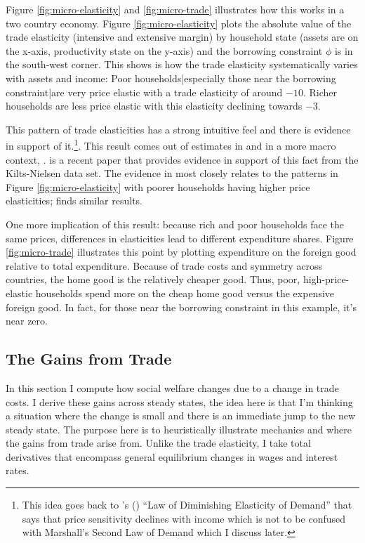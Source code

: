 \documentclass[12pt,pdftex]{article}
\def\citeapos#1{\citeauthor{#1}'s (\citeyear{#1})}
\begin{document}
\begin{onehalfspacing}
Figure \ref{fig:micro-elasticity} and \ref{fig:micro-trade} illustrates how this works in a two country economy. Figure \ref{fig:micro-elasticity} plots the absolute value of the trade elasticity (intensive and extensive margin) by household state (assets are on the x-axis, productivity state on the y-axis) and the borrowing constraint $\phi$ is in the south-west corner. This shows is how the trade elasticity systematically varies with assets and income: Poor households|especially those near the borrowing constraint|are very price elastic with a trade elasticity of around $-10$. Richer households are less price elastic with this elasticity declining towards $-3.$

This pattern of trade elasticities has a strong intuitive feel and there is evidence in support of it.\footnote{This idea goes back to \citeapos{harrod1936trade} ``Law of Diminishing Elasticity of Demand'' that says that price sensitivity declines with income which is not to be confused with Marshall's Second Law of Demand which I discuss later.}. This result comes out of estimates in \citet{berry1995automobile} and in a more macro context, \citet{nakamura2010accounting}. \citet{sangani2022markups} is a recent paper that provides evidence in support of this fact from the Kilts-Nielsen data set. The evidence in \citet*{auer2022unequal} most closely relates to the patterns in Figure \ref{fig:micro-elasticity} with poorer households having higher price elasticities; \citet*{colicev2022impact} finds similar results.

One more implication of this result: because rich and poor households face the same prices, differences in elasticities lead to different expenditure shares. Figure \ref{fig:micro-trade} illustrates this point by plotting expenditure on the foreign good relative to total expenditure. Because of trade costs and symmetry across countries, the home good is the relatively cheaper good. Thus, poor, high-price-elastic households spend more on the cheap home good versus the expensive foreign good. In fact, for those near the borrowing constraint in this example, it's near zero.

\subsection{The Gains from Trade}

In this section I compute how social welfare changes due to a change in trade costs. I derive these gains across steady states, the idea here is that I'm thinking a situation where the change is small and there is an immediate jump to the new steady state. The purpose here is to heuristically illustrate mechanics and where the gains from trade arise from. Unlike the trade elasticity, I take total derivatives that encompass general equilibrium changes in wages and interest rates.


\end{onehalfspacing}
\end{document}
